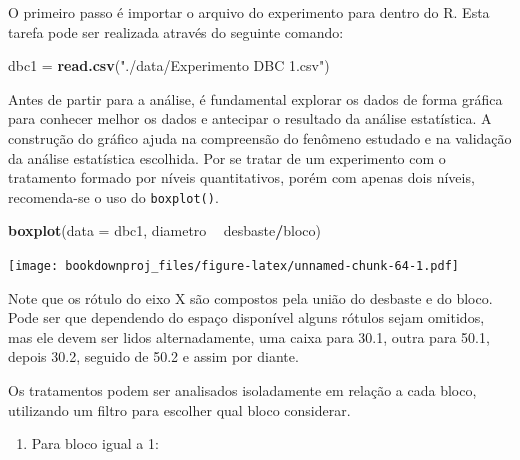 \documentclass[
]{article}
\newenvironment{Shaded}{\begin{snugshade}}{\end{snugshade}}
\newcommand{\DataTypeTok}[1]{\textcolor[rgb]{0.13,0.29,0.53}{#1}}
\newcommand{\DecValTok}[1]{\textcolor[rgb]{0.00,0.00,0.81}{#1}}
\newcommand{\KeywordTok}[1]{\textcolor[rgb]{0.13,0.29,0.53}{\textbf{#1}}}
\newcommand{\NormalTok}[1]{#1}
\newcommand{\OperatorTok}[1]{\textcolor[rgb]{0.81,0.36,0.00}{\textbf{#1}}}
\newcommand{\StringTok}[1]{\textcolor[rgb]{0.31,0.60,0.02}{#1}}
\providecommand{\tightlist}{%
  \setlength{\itemsep}{0pt}\setlength{\parskip}{0pt}}
\begin{document}
O primeiro passo é importar o arquivo do experimento para dentro do R. Esta tarefa pode ser realizada através do seguinte comando:

\begin{Shaded}
\begin{Highlighting}[]
\NormalTok{dbc1 =}\StringTok{ }\KeywordTok{read.csv}\NormalTok{(}\StringTok{"./data/Experimento DBC 1.csv"}\NormalTok{)}
\end{Highlighting}
\end{Shaded}

Antes de partir para a análise, é fundamental explorar os dados de forma gráfica para conhecer melhor os dados e antecipar o resultado da análise estatística. A construção do gráfico ajuda na compreensão do fenômeno estudado e na validação da análise estatística escolhida. Por se tratar de um experimento com o tratamento formado por níveis quantitativos, porém com apenas dois níveis, recomenda-se o uso do \texttt{boxplot()}.

\begin{Shaded}
\begin{Highlighting}[]
\KeywordTok{boxplot}\NormalTok{(}\DataTypeTok{data =}\NormalTok{ dbc1, diametro }\OperatorTok{~}\StringTok{ }\NormalTok{desbaste}\OperatorTok{/}\NormalTok{bloco)}
\end{Highlighting}
\end{Shaded}

\texttt{[image: bookdownproj\_files/figure-latex/unnamed-chunk-64-1.pdf]}

Note que os rótulo do eixo X são compostos pela união do desbaste e do bloco. Pode ser que dependendo do espaço disponível alguns rótulos sejam omitidos, mas ele devem ser lidos alternadamente, uma caixa para 30.1, outra para 50.1, depois 30.2, seguido de 50.2 e assim por diante.

Os tratamentos podem ser analisados isoladamente em relação a cada bloco, utilizando um filtro para escolher qual bloco considerar.

\begin{enumerate}
\def\labelenumi{\arabic{enumi}.}
\tightlist
\item
  Para bloco igual a 1:
\end{enumerate}

\begin{Shaded}
\end{Shaded}
\end{document}
